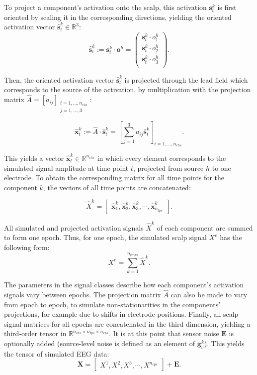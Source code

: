 To project a component's activation onto the scalp, this activation $\bm{s}^k_{t}$ is first oriented by scaling it in the corresponding directions, yielding the oriented activation vector $\bm{\hat{s}}^k_{t}\in \mathbb{R}^3$: \[ \bm{\hat{s}}^k_{t} := \bm{s}^k_{t} \cdot \bm{o}^h = \left(
\begin{array}{c}
\bm{s}^k_{t} \cdot o^h_1\\
\bm{s}^k_{t} \cdot o^h_2\\
\bm{s}^k_{t} \cdot o^h_3\\
\end{array}
\right).\]

Then, the oriented activation vector $\bm{\hat{s}}^k_{t}$ is projected through the lead field which corresponds to the source of the activation, by multiplication with the projection matrix $\hat{A}=\left[a_{ij}\right]_{\substack{i= 1, \dots, n_{chs}\\j=1, \dots, 3}}$:

\[ \bm{\hat{x}}^k_{t} := \hat{A} \cdot \bm{\hat{s}}^k_{t} = \left[ \sum_{j=1}^3 a_{ij} \bm{\hat{s}}^k_{t} \right]_{i= 1, \dots, n_{chs}}. \]

This yields a vector $\bm{\hat{x}}^k_{t} \in \mathbb{R}^{n_{chs}}$ in which every element corresponds to the simulated signal amplitude at time point $t$, projected from source $h$ to one electrode. To obtain the corresponding matrix for all time points for the component $k$, the vectors of all time points are concatenated:

$$\hat{X}^k = \begin{bmatrix} \bm{\hat{x}}^k_{1}, \bm{\hat{x}}^k_{2},  \bm{\hat{x}}^k_{3},  \cdots,  \bm{\hat{x}}^k_{n_{tps}}\end{bmatrix}.$$

All simulated and projected activation signals $\hat{X}^k$ of each component are summed to form one epoch. Thus, for one epoch, the simulated scalp signal $X^e$ has the following form:
$$X^e  = \sum_{k=1}^{n_{cmps}} \hat{X}^k.$$

The parameters in the signal classes describe how each component's activation signals vary between epochs. The projection matrix $\hat{A}$ can also be made to vary from epoch to epoch, to simulate non-stationarities in the components' projections, for example due to shifts in electrode positions. Finally, all scalp signal matrices for all epochs are concatenated in the third dimension, yielding a third-order tensor in $\mathbb{R}^{n_{chs} \times n_{tps} \times n_{eps}}$. It is at this point that sensor noise $\bm{E}$ is optionally added (source-level noise is defined as an element of  $\bm{g}^{k}_{c}$). This yields the tensor of simulated EEG data:
$$\bm{X} = \begin{bmatrix} X^1, X^2, X^3, \cdots, X^{n_{eps}}\end{bmatrix} + \bm{E}.$$

